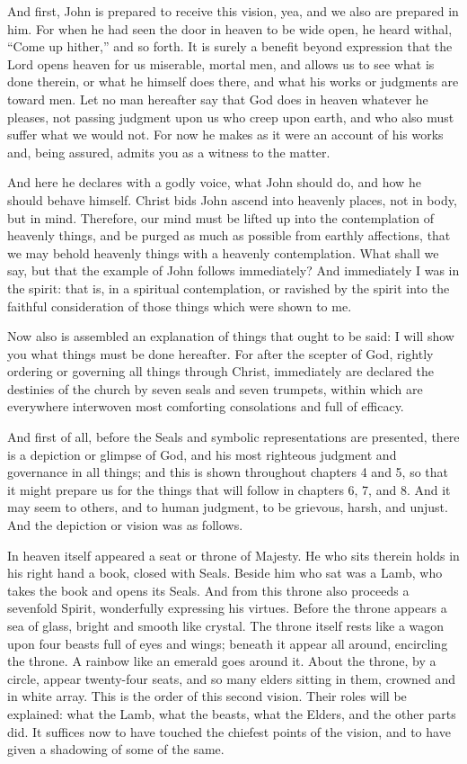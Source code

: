 And first, John is prepared to receive this vision, yea, and we also are prepared in him. For when he had seen the door in heaven to be wide open, he heard withal, “Come up hither,” and so forth. It is surely a benefit beyond expression that the Lord opens heaven for us miserable, mortal men, and allows us to see what is done therein, or what he himself does there, and what his works or judgments are toward men. Let no man hereafter say that God does in heaven whatever he pleases, not passing judgment upon us who creep upon earth, and who also must suffer what we would not. For now he makes as it were an account of his works and, being assured, admits you as a witness to the matter.

And here he declares with a godly voice, what John should do, and how he should behave himself. Christ bids John ascend into heavenly places, not in body, but in mind. Therefore, our mind must be lifted up into the contemplation of heavenly things, and be purged as much as possible from earthly affections, that we may behold heavenly things with a heavenly contemplation. What shall we say, but that the example of John follows immediately? And immediately I was in the spirit: that is, in a spiritual contemplation, or ravished by the spirit into the faithful consideration of those things which were shown to me.

Now also is assembled an explanation of things that ought to be said: I will show you what things must be done hereafter. For after the scepter of God, rightly ordering or governing all things through Christ, immediately are declared the destinies of the church by seven seals and seven trumpets, within which are everywhere interwoven most comforting consolations and full of efficacy.

And first of all, before the Seals and symbolic representations are presented, there is a depiction or glimpse of God, and his most righteous judgment and governance in all things; and this is shown throughout chapters 4 and 5, so that it might prepare us for the things that will follow in chapters 6, 7, and 8. And it may seem to others, and to human judgment, to be grievous, harsh, and unjust. And the depiction or vision was as follows.

In heaven itself appeared a seat or throne of Majesty. He who sits therein holds in his right hand a book, closed with Seals. Beside him who sat was a Lamb, who takes the book and opens its Seals. And from this throne also proceeds a sevenfold Spirit, wonderfully expressing his virtues. Before the throne appears a sea of glass, bright and smooth like crystal. The throne itself rests like a wagon upon four beasts full of eyes and wings; beneath it appear all around, encircling the throne. A rainbow like an emerald goes around it. About the throne, by a circle, appear twenty-four seats, and so many elders sitting in them, crowned and in white array. This is the order of this second vision. Their roles will be explained: what the Lamb, what the beasts, what the Elders, and the other parts did. It suffices now to have touched the chiefest points of the vision, and to have given a shadowing of some of the same.

